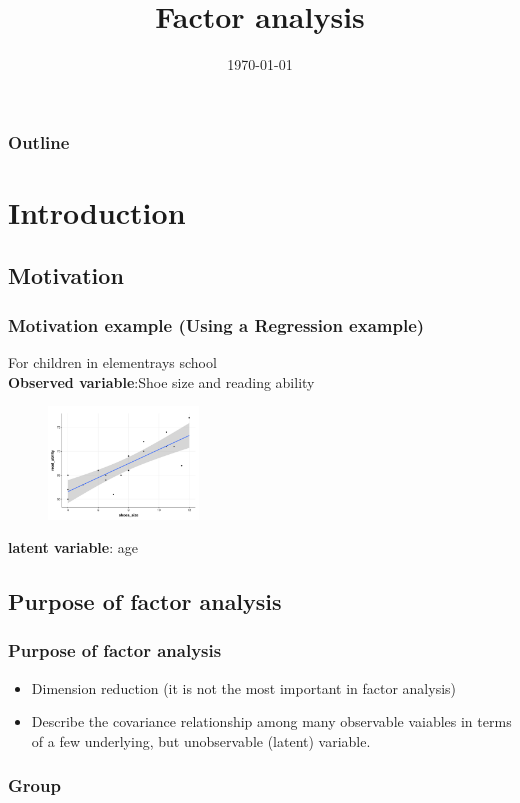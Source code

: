 \documentclass{beamer}
\title[Short title]{Factor analysis} %
\author{}
\institute[NCU] %
{
  National Central University %
}
\date{\today} %
\begin{document}
\begin{frame}
\titlepage %
\end{frame}

\begin{frame}
\frametitle{Outline} 
\tableofcontents
\end{frame}

  
\section{Introduction} %
\subsection{Motivation} 
\begin{frame}
\frametitle{Motivation example (Using a Regression example)}
For children in elementrays school\\
\textbf{Observed variable}:Shoe size and reading ability
\begin{figure}
\includegraphics[width=4cm]{shoe.png}
\centering
\end{figure}
\textbf{latent variable}: age
\end{frame}
\subsection{Purpose of factor analysis} 
\begin{frame}
\frametitle{Purpose of factor analysis}
\begin{itemize}
\item Dimension reduction (it is not the most important in factor analysis)
\item Describe the  covariance relationship among many observable vaiables in terms of a few underlying, but unobservable (latent) variable.
\end{itemize}
\end{frame}
\frametitle{Group}
\end{document}
